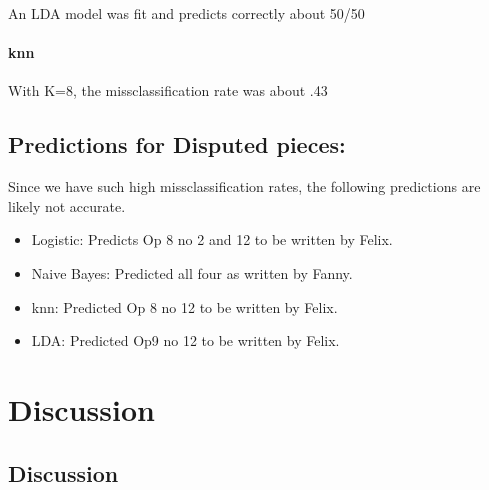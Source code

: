 \documentclass[12pt,twoside]{reedthesis}
\providecommand{\tightlist}{%
  \setlength{\itemsep}{0pt}\setlength{\parskip}{0pt}}
\theoremstyle{definition}
\theoremstyle{definition}
\theoremstyle{definition}
\theoremstyle{remark}
\begin{document}
An LDA model was fit and predicts correctly about 50/50

\subsubsection{knn}\label{knn-1}

With K=8, the missclassification rate was about .43

\section{Predictions for Disputed
pieces:}\label{predictions-for-disputed-pieces}

Since we have such high missclassification rates, the following
predictions are likely not accurate.
\begin{itemize}
\tightlist
\item
  Logistic: Predicts Op 8 no 2 and 12 to be written by Felix.
\item
  Naive Bayes: Predicted all four as written by Fanny.
\item
  knn: Predicted Op 8 no 12 to be written by Felix.
\item
  LDA: Predicted Op9 no 12 to be written by Felix.
\end{itemize}
\chapter{Discussion}\label{discussion}

\section{Discussion}\label{discussion-1}
\end{document}
